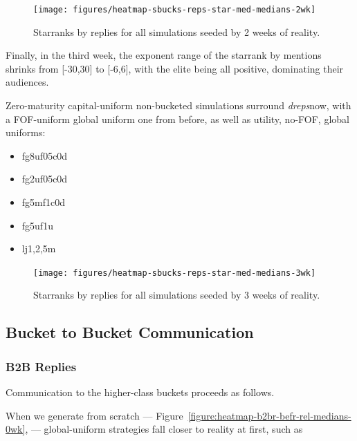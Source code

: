 \documentclass[10pt,oneside]{memoir}
\begin{document}
\begin{figure}
\begin{center}
    \texttt{[image: figures/heatmap-sbucks-reps-star-med-medians-2wk]}
    \caption{Starranks by replies for all simulations seeded by 2 weeks of reality.}
    \label{figure:heatmap-sbucks-reps-star-med-medians-2wk}
\end{center}
\end{figure}
Finally, in the third week, the exponent range of the starrank by mentions shrinks from [-30,30] to [-6,6], with the elite being all positive, dominating their audiences.


Zero-maturity capital-uniform non-bucketed simulations surround {\itshape dreps}now, with a FOF-uniform global uniform one from before, as well as utility, no-FOF, global uniforms:


\begin{itemize}


\item fg8uf05c0d

\item fg2uf05c0d

\item fg5mf1c0d

\item fg5uf1u

\item lj{1,2,5}m
\end{itemize}


\begin{figure}
\begin{center}
    \texttt{[image: figures/heatmap-sbucks-reps-star-med-medians-3wk]}
    \caption{Starranks by replies for all simulations seeded by 3 weeks of reality.}
    \label{figure:heatmap-sbucks-reps-star-med-medians-3wk}
\end{center}
\end{figure}
\pagebreak \subsection{Bucket to Bucket Communication}
\label{buckettobucketcommunication}

\subsubsection{B2B Replies}
\label{b2breplies}

Communication to the higher-class buckets proceeds as follows.


When we generate from scratch --- Figure~\ref{figure:heatmap-b2br-befr-rel-medians-0wk}, --- global-uniform strategies fall closer to reality at first, such as
\end{document}
